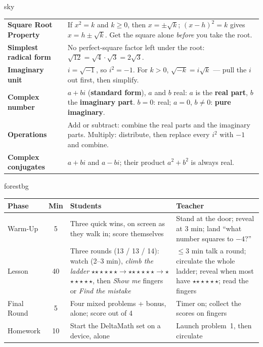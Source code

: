 \documentclass[10pt]{article}
\newcommand{\MeetingLength}{60 minutes}
\newcommand{\rung}[1]{{\color{goldacc}\ifcase#1\or$\star$\or$\star\star$\or$\star\star\star$\fi}}
\begin{document}
\begin{skillbox}{sky}
\renewcommand{\arraystretch}{1.3}
\begin{tabularx}{\linewidth}{@{}l X@{}}
\textbf{Square Root Property} & If $x^2=k$ and $k\ge0$, then $x=\pm\sqrt{k}$; $(x-h)^2=k$ gives
                                $x=h\pm\sqrt{k}$. Get the square alone \emph{before} you take the root. \\
\textbf{Simplest radical form} & No perfect-square factor left under the root:
                                 $\sqrt{12}=\sqrt4\cdot\sqrt3=2\sqrt3$. \\
\textbf{Imaginary unit} & $i=\sqrt{-1}$, so $i^2=-1$. For $k>0$, $\sqrt{-k}=i\sqrt{k}$ --- pull the
                          $i$ out first, then simplify. \\
\textbf{Complex number} & $a+bi$ (\textbf{standard form}), $a$ and $b$ real: $a$ is the
                          \textbf{real part}, $b$ the \textbf{imaginary part}. $b=0$: real;
                          $a=0$, $b\ne0$: \textbf{pure imaginary}. \\
\textbf{Operations} & Add or subtract: combine the real parts and the imaginary parts. Multiply:
                      distribute, then replace every $i^2$ with $-1$ and combine. \\
\textbf{Complex conjugates} & $a+bi$ and $a-bi$; their product $a^2+b^2$ is always real. \\
\end{tabularx}
\end{skillbox}

\begin{fixedskillbox}[Lesson at a Glance --- \MeetingLength]{forestbg}
\renewcommand{\arraystretch}{1.25}
\begin{tabularx}{\linewidth}{@{}l c X X@{}}
\textbf{Phase} & \textbf{Min} & \textbf{Students} & \textbf{Teacher} \\
\hline
Warm-Up & 5 & Three quick wins, on screen as they walk in; score themselves & Stand at the door; reveal at 3 min; land ``what number squares to $-4$?'' \\
Lesson & 40 & Three rounds (13 / 13 / 14): watch (2--3 min), \emph{climb the ladder} \rung1$\to$\rung2$\to$\rung3, then \emph{Show me} fingers or \emph{Find the mistake} & $\le$3 min talk a round; circulate the whole ladder; reveal when most have \rung2; read the fingers \\
Final Round & 5 & Four mixed problems + bonus, alone; score out of 4 & Timer on; collect the scores on fingers \\
Homework & 10 & Start the DeltaMath set on a device, alone & Launch problem~1, then circulate \\
\end{tabularx}
\end{fixedskillbox}
\end{document}
